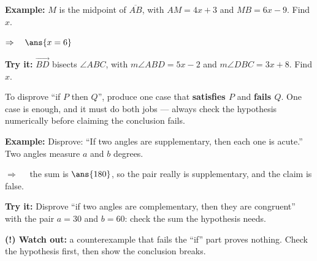 \documentclass[12pt]{article}
\begin{document}
\begin{examplebox}
\textbf{Example:} \quad $M$ is the midpoint of $\overline{AB}$, with $AM = 4x + 3$ and $MB = 6x - 9$. Find $x$.

$\Rightarrow\quad \ans{x = 6}$
\end{examplebox}

\begin{tryitbox}
\textbf{Try it:} \quad $\overrightarrow{BD}$ bisects $\angle ABC$, with $m\angle ABD = 5x - 2$ and $m\angle DBC = 3x + 8$. Find $x$.\\[2pt]
\end{tryitbox}


\begin{formulabox}
To disprove ``if $P$ then $Q$'', produce one case that \textbf{satisfies $P$} and \textbf{fails $Q$}. One case is enough, and it must do both jobs --- always check the hypothesis numerically before claiming the conclusion fails.
\end{formulabox}

\begin{examplebox}
\textbf{Example:} \quad Disprove: ``If two angles are supplementary, then each one is acute.'' Two angles measure $a$ and $b$ degrees.

$\Rightarrow\quad$ the sum is $\ans{180}$, so the pair really is supplementary, and the claim is false.
\end{examplebox}

\begin{tryitbox}
\textbf{Try it:} \quad Disprove ``if two angles are complementary, then they are congruent'' with the pair $a = 30$ and $b = 60$: check the sum the hypothesis needs.\\[2pt]
\end{tryitbox}

\begin{watchoutbox}
\textbf{(!) Watch out:} a counterexample that fails the ``if'' part proves nothing. Check the hypothesis first, then show the conclusion breaks.
\end{watchoutbox}
\end{document}
